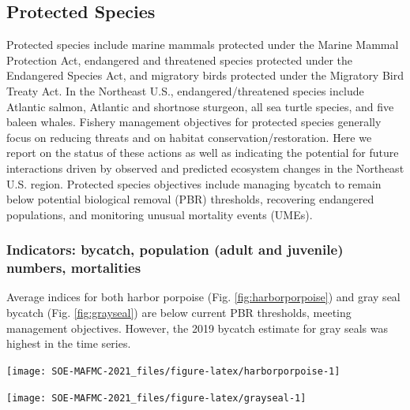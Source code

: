 \documentclass[
  10pt,
]{article}
\let\origfigure\figure
\let\endorigfigure\endfigure
\renewenvironment{figure}[1][2] {
    \expandafter\origfigure\expandafter[H]
} {
    \endorigfigure
}
\begin{document}
\hypertarget{protected-species}{%
\subsection{Protected Species}\label{protected-species}}

Protected species include marine mammals protected under the Marine
Mammal Protection Act, endangered and threatened species protected under
the Endangered Species Act, and migratory birds protected under the
Migratory Bird Treaty Act. In the Northeast U.S., endangered/threatened
species include Atlantic salmon, Atlantic and shortnose sturgeon, all
sea turtle species, and five baleen whales. Fishery management
objectives for protected species generally focus on reducing threats and
on habitat conservation/restoration. Here we report on the status of
these actions as well as indicating the potential for future
interactions driven by observed and predicted ecosystem changes in the
Northeast U.S. region. Protected species objectives include managing
bycatch to remain below potential biological removal (PBR) thresholds,
recovering endangered populations, and monitoring unusual mortality
events (UMEs).

\hypertarget{indicators-bycatch-population-adult-and-juvenile-numbers-mortalities}{%
\subsubsection{Indicators: bycatch, population (adult and juvenile)
numbers,
mortalities}\label{indicators-bycatch-population-adult-and-juvenile-numbers-mortalities}}

Average indices for both harbor porpoise (Fig. \ref{fig:harborporpoise})
and gray seal bycatch (Fig. \ref{fig:grayseal}) are below current PBR
thresholds, meeting management objectives. However, the 2019 bycatch
estimate for gray seals was highest in the time series.

\begin{figure}

{\centering \texttt{[image: SOE-MAFMC-2021\_files/figure-latex/harborporpoise-1]} 

}

\caption{Harbor porpoise average bycatch estimate for Mid-Atlantic and New England fisheries (blue) and the potential biological removal (red). 2019 estimates are preliminary.}\label{fig:harborporpoise}
\end{figure}

\begin{figure}

{\centering \texttt{[image: SOE-MAFMC-2021\_files/figure-latex/grayseal-1]} 

}

\caption{Gray Seal average bycatch estimate for New England gillnet fisheries (blue) and and the potential biological removal (red). 2019 estimates are preliminary.}\label{fig:grayseal}
\end{figure}
\end{document}
